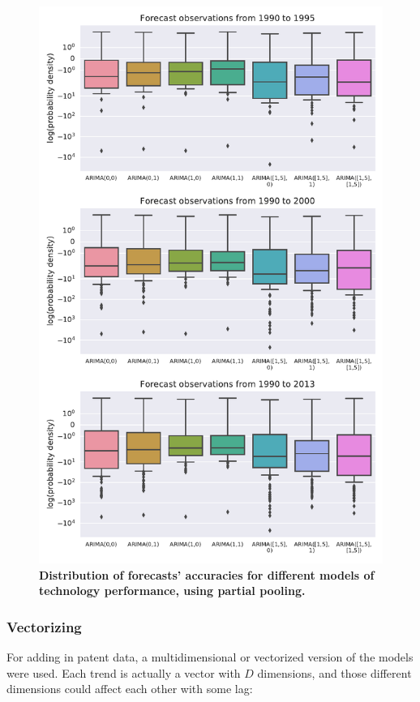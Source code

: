 \documentclass{article}
\begin{document}
\begin{figure}
    \centering
    \includegraphics[height=.75\textheight]{figs/Pooled_Models_Forecast_Quality_Performance.pdf}
    \caption{\textbf{Distribution of forecasts' accuracies for different models of technology performance, using partial pooling.}}\label{fig:Pooled_Models_Forecast_Quality_Performance}
\end{figure}

\subsubsection{Vectorizing}
For adding in patent data, a multidimensional or vectorized version of the models were used. Each trend is actually a vector with $D$ dimensions, and those different dimensions could affect each other with some lag:
\end{document}
